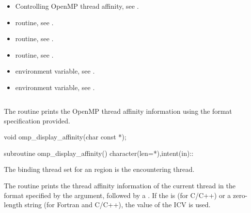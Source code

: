 \crossreferences
\begin{itemize}
\item Controlling OpenMP thread affinity, see
.
\item {} routine, see .
\item {} routine, see .
\item {} routine, see .
\item {} environment variable, see
.
\item {} environment variable, see
.
\end{itemize}


\subsection{}
\label{subsec:omp_display_affinity}

\summary
The  routine prints the OpenMP thread affinity information using the format specification provided.

\format
\begin{ccppspecific}
\begin{ompcFunction}
void omp_display_affinity(char const *);
\end{ompcFunction}
\end{ccppspecific}


\begin{fortranspecific}
\begin{ompfSubroutine}
subroutine omp_display_affinity()
character(len=*),intent(in)::
\end{ompfSubroutine}
\end{fortranspecific}

\binding
The binding thread set for an  region is the encountering thread.

\effect
The  routine prints the thread affinity information of the current thread in the format
specified by the  argument, followed by a .
If the  is  (for C/C++) or a zero-length string
(for Fortran and C/C++), the value of the  ICV is used.

